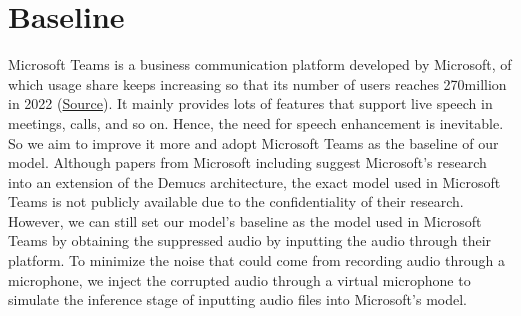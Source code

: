 \documentclass[11pt]{article}
\begin{document}
\section{Baseline}

Microsoft Teams is a business communication platform developed by Microsoft, of which usage share keeps increasing so that its number of users reaches 270million in 2022 (\href{(https://www.businessofapps.com/data/microsoft-teams-statistics/)}{Source}). It mainly provides lots of features that support live speech in meetings, calls, and so on. Hence, the need for speech enhancement is inevitable. So we aim to improve it more and adopt Microsoft Teams as the baseline of our model. Although papers from Microsoft including \cite{microsoftTeams} suggest Microsoft’s research into an extension of the Demucs architecture, the exact model used in Microsoft Teams is not publicly available due to the confidentiality of their research. However, we can still set our model’s baseline as the model used in Microsoft Teams by obtaining the suppressed audio by inputting the audio through their platform. To minimize the noise that could come from recording audio through a microphone, we inject the corrupted audio through a virtual microphone to simulate the inference stage of inputting audio files into Microsoft’s model.





\end{document}
